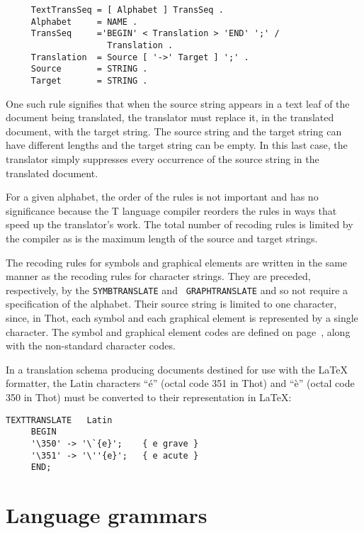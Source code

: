\begin{verbatim}
     TextTransSeq = [ Alphabet ] TransSeq .
     Alphabet     = NAME .
     TransSeq     ='BEGIN' < Translation > 'END' ';' /
                    Translation .
     Translation  = Source [ '->' Target ] ';' .
     Source       = STRING .
     Target       = STRING .
\end{verbatim}

One such rule signifies that when the source string appears in a text
leaf of the document being translated, the translator must replace it,
in the translated document, with the target string.  The source string
and the target string can have different lengths and the target string
can be empty.  In this last case, the translator simply suppresses
every occurrence of the source string in the translated document.

For a given alphabet, the order of the rules is not important and has
no significance because the T language compiler reorders the rules in
ways that speed up the translator's work.  The total number of
recoding rules is limited by the compiler as is the maximum length
of the source and target strings.

The recoding rules for symbols and graphical elements are written in
the same manner as the recoding rules for character strings.  They are
preceded, respectively, by the {\tt SYMBTRANSLATE} and {\tt
GRAPHTRANSLATE} and so not require a specification of the alphabet.
Their source string is limited to one character, since, in Thot, each
symbol and each graphical element is represented by a single
character.  The symbol and graphical element codes are defined on
page~\pageref{codage}, along with the non-standard character codes.

\begin{example}

In a translation schema producing documents destined for use with the
{\LaTeX} formatter, the Latin characters ``\'{e}'' (octal code 351 in
Thot) and ``\`{e}'' (octal code 350 in Thot)  must be converted to
their representation in {\LaTeX}:
\begin{verbatim}
TEXTTRANSLATE	Latin
     BEGIN
     '\350' -> '\`{e}';    { e grave }
     '\351' -> '\''{e}';   { e acute }
     END;
\end{verbatim}
\end{example}

\chapter{Language grammars}

